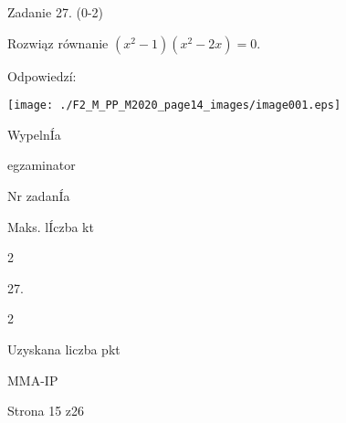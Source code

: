\documentclass[a4paper,12pt]{article}
\begin{document}
Zadanie 27. (0-2)

Rozwiąz równanie $(x^{2}-1)(x^{2}-2x)=0.$

Odpowiedzí:
\begin{center}
\texttt{[image: ./F2\_M\_PP\_M2020\_page14\_images/image001.eps]}
\end{center}
WypelnÍa

egzaminator

Nr zadanÍa

Maks. lÍczba kt

2

27.

2

Uzyskana liczba pkt

MMA-IP

Strona 15 z26
\end{document}
